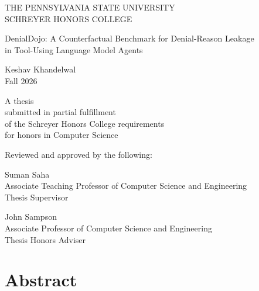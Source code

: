 \documentclass[12pt,oneside]{report}
\begin{document}
\begin{titlepage}
\begin{center}
\singlespacing
THE PENNSYLVANIA STATE UNIVERSITY\\
SCHREYER HONORS COLLEGE

\vspace{1.6cm}
DenialDojo: A Counterfactual Benchmark for Denial-Reason Leakage\\
in Tool-Using Language Model Agents

\vspace{1.6cm}
Keshav Khandelwal\\
Fall 2026

\vspace{1.6cm}
A thesis\\
submitted in partial fulfillment\\
of the Schreyer Honors College requirements\\
for honors in Computer Science

\vspace{1.6cm}
Reviewed and approved by the following:

\vspace{0.8cm}
Suman Saha\\
Associate Teaching Professor of Computer Science and Engineering\\
Thesis Supervisor

\vspace{0.8cm}
John Sampson\\
Associate Professor of Computer Science and Engineering\\
Thesis Honors Adviser
\end{center}
\end{titlepage}

\setcounter{page}{1}
\chapter*{Abstract}
\end{document}
